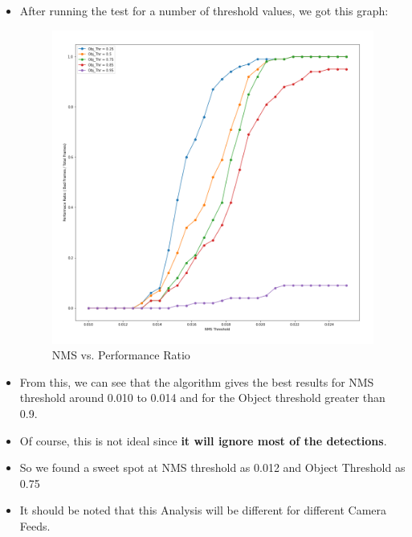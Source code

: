\documentclass[a4paper]{article}
\begin{document}
\begin{enumerate}
\begin{itemize}
        
        \pagebreak
        \item After running the test for a number of threshold values, we got this graph:
        \begin{figure}[h]
            \centering
            \includegraphics[width=\linewidth]{Pictures/NMS vs Performance_cropped.png} 
            \caption{NMS vs. Performance Ratio}
            \label{fig:NMSvsPerf}
        \end{figure}
        \item From this, we can see that the algorithm gives the best results for NMS threshold around 0.010 to 0.014 and for the Object threshold greater than 0.9.
        \item Of course, this is not ideal since \textbf{it will ignore most of the detections}.
        \item So we found a sweet spot at NMS threshold as 0.012 and Object Threshold as 0.75
        \item It should be noted that this Analysis will be different for different Camera Feeds.
    \end{itemize}
\end{enumerate}

\pagebreak
\end{document}
